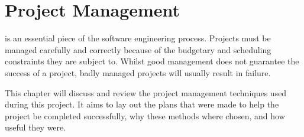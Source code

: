 \chapter[Project Management]{Project Management}
\label{ch:pm}


 is an essential piece of the software engineering process.
Projects must be managed carefully and correctly because of the budgetary and scheduling
constraints they are subject to. Whilst good management does not guarantee the success of
a project, badly managed projects will usually result in failure.

This chapter will discuss and review the project management techniques used during this project.
It aims to lay out the plans that were made to help the project be completed successfully, why
these methods where chosen, and how useful they were.

\clearpage
\clearpage
\clearpage
\clearpage
\clearpage
\clearpage
\clearpage
\clearpage
\clearpage
\clearpage
\clearpage
